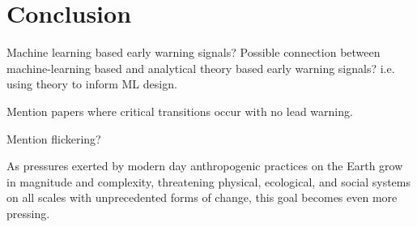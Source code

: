 \section{Conclusion}
\label{sec:conclusion}


Machine learning based early warning signals? Possible connection between machine-learning based and analytical theory based early warning signals? i.e. using theory to inform ML design. 


Mention papers where critical transitions occur with no lead warning.

Mention flickering?

As pressures exerted by modern day anthropogenic practices on the Earth grow in magnitude and complexity, threatening physical, ecological, and social systems on all scales with unprecedented forms of change, this goal becomes even more pressing. 